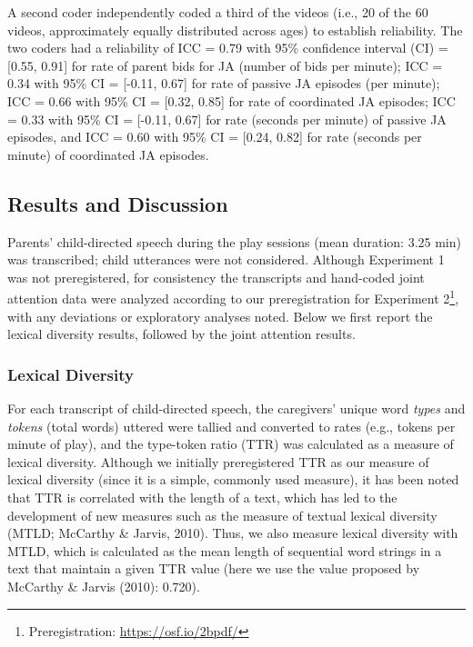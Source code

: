 \documentclass[man,floatsintext]{apa6}
\begin{document}
A second coder independently coded a third of the videos (i.e., 20 of the 60 videos, approximately equally distributed across ages) to establish reliability.
The two coders had a reliability of ICC = 0.79 with 95\% confidence interval (CI) = {[}0.55, 0.91{]} for rate of parent bids for JA (number of bids per minute); ICC = 0.34 with 95\% CI = {[}-0.11, 0.67{]} for rate of passive JA episodes (per minute); ICC = 0.66 with 95\% CI = {[}0.32, 0.85{]} for rate of coordinated JA episodes; ICC = 0.33 with 95\% CI = {[}-0.11, 0.67{]} for rate (seconds per minute) of passive JA episodes, and ICC = 0.60 with 95\% CI = {[}0.24, 0.82{]} for rate (seconds per minute) of coordinated JA episodes.

\hypertarget{results-and-discussion}{%
\subsection{Results and Discussion}\label{results-and-discussion}}

Parents' child-directed speech during the play sessions (mean duration: 3.25 min) was transcribed; child utterances were not considered.
Although Experiment 1 was not preregistered, for consistency the transcripts and hand-coded joint attention data were analyzed according to our preregistration for Experiment 2\footnote{Preregistration: \href{https://osf.io/2bpdf}{https://osf.io/2bpdf/}}, with any deviations or exploratory analyses noted.
Below we first report the lexical diversity results, followed by the joint attention results.

\hypertarget{lexical-diversity}{%
\subsubsection{Lexical Diversity}\label{lexical-diversity}}

For each transcript of child-directed speech, the caregivers' unique word \emph{types} and \emph{tokens} (total words) uttered were tallied and converted to rates (e.g., tokens per minute of play), and the type-token ratio (TTR) was calculated as a measure of lexical diversity.
Although we initially preregistered TTR as our measure of lexical diversity (since it is a simple, commonly used measure), it has been noted that TTR is correlated with the length of a text, which has led to the development of new measures such as the measure of textual lexical diversity (MTLD; McCarthy \& Jarvis, 2010).
Thus, we also measure lexical diversity with MTLD, which is calculated as the mean length of sequential word strings in a text that maintain a given TTR value (here we use the value proposed by McCarthy \& Jarvis (2010): 0.720).
\end{document}
